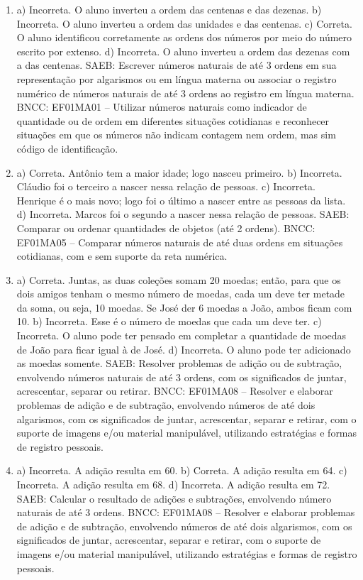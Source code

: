 \begin{enumerate}
\item
a) Incorreta. O aluno inverteu a ordem das centenas e das dezenas.
b) Incorreta. O aluno inverteu a ordem das unidades e das centenas.
c) Correta. O aluno identificou corretamente as ordens dos números
por meio do número escrito por extenso.
d) Incorreta. O aluno inverteu a ordem das dezenas com a das centenas.
SAEB: Escrever números naturais de até 3 ordens em sua
representação por algarismos ou em língua materna ou associar o registro
numérico de números naturais de até 3 ordens ao registro em língua
materna.
BNCC: EF01MA01 -- Utilizar números naturais como indicador de quantidade
ou de ordem em diferentes situações cotidianas e reconhecer situações em
que os números não indicam contagem nem ordem, mas sim código de
identificação.

\item
a) Correta. Antônio tem a maior idade; logo nasceu primeiro.
b) Incorreta. Cláudio foi o terceiro a nascer nessa relação de pessoas.
c) Incorreta. Henrique é o mais novo; logo foi o último a nascer entre as pessoas da lista.
d) Incorreta. Marcos foi o segundo a nascer nessa relação de pessoas.
SAEB: Comparar ou ordenar quantidades de objetos (até 2
ordens).
BNCC: EF01MA05 -- Comparar números naturais de até duas ordens em
situações cotidianas, com e sem suporte da reta numérica.

\item
a) Correta. Juntas, as duas coleções somam 20 moedas; então, para que os dois amigos tenham o mesmo número de moedas, cada um deve ter metade da soma, ou seja, 10 moedas. Se José der 6 moedas a João, ambos ficam com 10.
b) Incorreta. Esse é o número de moedas que cada um deve ter.
c) Incorreta. O aluno pode ter pensado em completar a quantidade de
moedas de João para ficar igual à de José.
d) Incorreta. O aluno pode ter adicionado as moedas somente.
SAEB: Resolver problemas de adição ou de subtração, envolvendo
números naturais de até 3 ordens, com os significados de juntar,
acrescentar, separar ou retirar.
BNCC: EF01MA08 -- Resolver e elaborar problemas de adição e de subtração,
envolvendo números de até dois algarismos, com os significados de
juntar, acrescentar, separar e retirar, com o suporte de imagens e/ou
material manipulável, utilizando estratégias e formas de registro
pessoais.

\item
a) Incorreta. A adição resulta em 60.
b) Correta. A adição resulta em 64.
c) Incorreta. A adição resulta em 68.
d) Incorreta. A adição resulta em 72.
SAEB: Calcular o resultado de adições e subtrações, envolvendo
número naturais de até 3 ordens.
BNCC: EF01MA08 -- Resolver e elaborar problemas de adição e de subtração,
envolvendo números de até dois algarismos, com os significados de
juntar, acrescentar, separar e retirar, com o suporte de imagens e/ou
material manipulável, utilizando estratégias e formas de registro
pessoais.


\end{enumerate}
